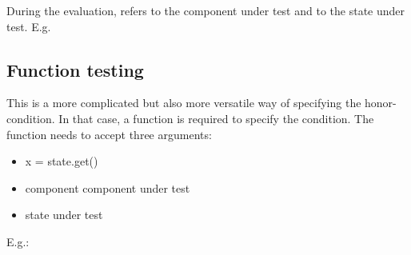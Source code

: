 \documentclass[letterpaper,10pt,english]{sphinxmanual}
\begin{document}
During the evaluation,  refers to the component under test and  to the state under test.
E.g.

\begin{sphinxVerbatim}[commandchars=\\\{\}]
  
  
\end{sphinxVerbatim}


\subsection{Function testing}
\label{\detokenize{State:function-testing}}
This is a more complicated but also more versatile way of specifying the honor-condition.
In that case, a function is required to specify the condition. The function needs to accept three
arguments:
\begin{itemize}
\item {} 
x = state.get()

\item {} 
component component under test

\item {} 
state under test

\end{itemize}

E.g.:

\begin{sphinxVerbatim}[commandchars=\\\{\}]
         
        
\end{sphinxVerbatim}
\end{document}
